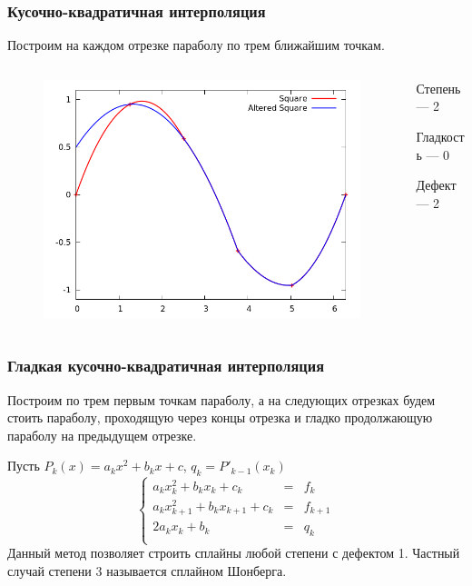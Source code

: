 \documentclass[aspectratio=169,unicode]{beamer}
\begin{document}
\begin{frame}
\frametitle{Кусочно-квадратичная интерполяция}
	Построим на каждом отрезке параболу по трем ближайшим точкам.
	\begin{columns}[c]
	\begin{column}{0.6\textwidth}
	\begin{figure}
	\center
	\includegraphics[height=.7\textheight]{spline2_2.png}%
	\end{figure}
	\end{column}
	\begin{column}{0.4\textwidth}
	Степень --- 2

	Гладкость --- 0

	Дефект --- 2
	\end{column}
	\end{columns}
\end{frame}

\begin{frame}
\frametitle{Гладкая кусочно-квадратичная интерполяция}
	Построим по трем первым точкам параболу, а на следующих отрезках будем стоить параболу, проходящую
	через концы отрезка и гладко продолжающую параболу на предыдущем отрезке.

	Пусть $P_k(x) = a_kx^2+b_kx+c$, $q_k = P'_{k-1}(x_k)$
	\[
	\left\{
	\begin{array}{lcl}
		a_kx_k^2+b_kx_k+c_k &=& f_k\\
		a_kx_{k+1}^2+b_kx_{k+1}+c_k &=& f_{k+1}\\
		2a_kx_k+b_k &=& q_k\\
	\end{array}
	\right.
	\]
	Данный метод позволяет строить сплайны любой степени с дефектом 1. Частный случай степени 3 называется сплайном Шонберга.
\end{frame}
\end{document}
